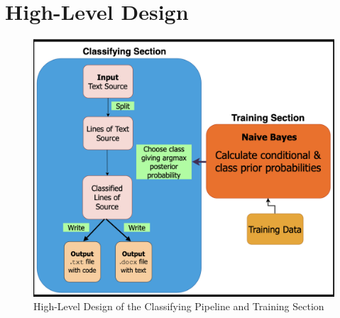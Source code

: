 \documentclass[12pt]{scrreprt}
\begin{document}
\newpage 


\section{High-Level Design}


\begin{figure}[h]
    \centering
    \includegraphics[width=1.0\textwidth]{figures/NB-high-design.png}
    \caption{High-Level Design of the Classifying Pipeline and Training Section}
    \label{fig:high-level-design}
\end{figure}
\end{document}
